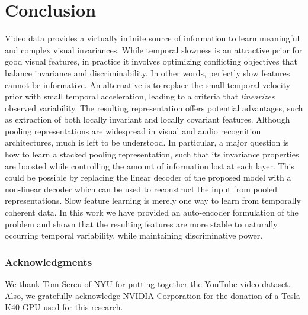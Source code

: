 \documentclass{article} %
\begin{document}
\section{Conclusion}
Video data provides a virtually infinite source of information to learn 
meaningful and complex visual invariances. While temporal slowness is an attractive prior for good visual features, in practice it involves optimizing conflicting objectives that balance invariance and discriminability. In other words, perfectly slow features cannot be informative. An alternative is to replace the small temporal velocity prior with small temporal acceleration, leading to a criteria that \emph{linearizes} observed variability. The resulting representation offers potential advantages, such as extraction of both locally invariant and locally covariant features. Although pooling representations are widespread in visual and audio recognition architectures, much is left to be understood. In particular, a major question is 
how to learn a stacked pooling representation, such that its invariance properties are boosted while controlling the amount of information lost at each layer. This could be possible by replacing the linear decoder of the proposed model with a non-linear decoder which can be used to reconstruct the input from pooled representations. Slow feature learning is merely one way to learn from temporally coherent data. In this work we have provided an auto-encoder formulation of the problem and shown that the resulting features are more stable to naturally occurring temporal variability, while maintaining discriminative power.

\subsubsection*{Acknowledgments}
We thank Tom Sercu of NYU for putting together the YouTube video dataset. Also, we gratefully acknowledge NVIDIA Corporation for the donation of a Tesla K40 GPU used for this research.   

{\small


}
\end{document}
